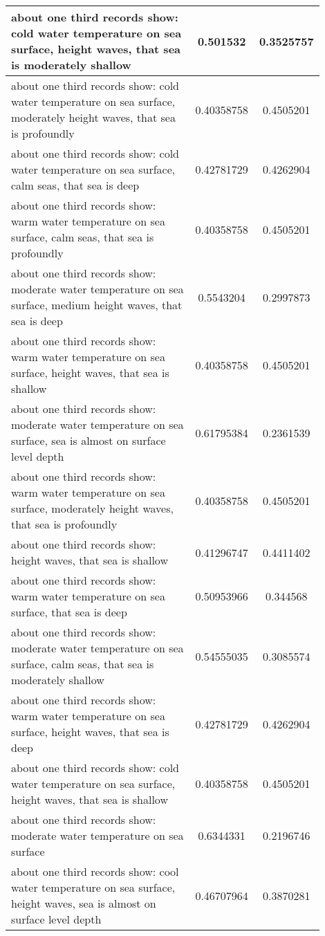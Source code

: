 \documentclass{article}
\begin{document}
\begin{longtable}{|p{0.9\linewidth}|c|c|}
about one third records show: cold water temperature on sea surface, height waves, that sea is moderately shallow & 0.501532 & 0.3525757 \\ \hline
about one third records show: cold water temperature on sea surface, moderately height waves, that sea is profoundly & 0.40358758 & 0.4505201 \\ \hline
about one third records show: cold water temperature on sea surface, calm seas, that sea is deep & 0.42781729 & 0.4262904 \\ \hline
about one third records show: warm water temperature on sea surface, calm seas, that sea is profoundly & 0.40358758 & 0.4505201 \\ \hline
about one third records show: moderate water temperature on sea surface, medium height waves, that sea is deep & 0.5543204 & 0.2997873 \\ \hline
about one third records show: warm water temperature on sea surface, height waves, that sea is shallow & 0.40358758 & 0.4505201 \\ \hline
about one third records show: moderate water temperature on sea surface, sea is almost on surface level depth & 0.61795384 & 0.2361539 \\ \hline
about one third records show: warm water temperature on sea surface, moderately height waves, that sea is profoundly & 0.40358758 & 0.4505201 \\ \hline
about one third records show: height waves, that sea is shallow & 0.41296747 & 0.4411402 \\ \hline
about one third records show: warm water temperature on sea surface, that sea is deep & 0.50953966 & 0.344568 \\ \hline
about one third records show: moderate water temperature on sea surface, calm seas, that sea is moderately shallow & 0.54555035 & 0.3085574 \\ \hline
about one third records show: warm water temperature on sea surface, height waves, that sea is deep & 0.42781729 & 0.4262904 \\ \hline
about one third records show: cold water temperature on sea surface, height waves, that sea is shallow & 0.40358758 & 0.4505201 \\ \hline
about one third records show: moderate water temperature on sea surface & 0.6344331 & 0.2196746 \\ \hline
about one third records show: cool water temperature on sea surface, height waves, sea is almost on surface level depth & 0.46707964 & 0.3870281 \\ \hline

\end{longtable}
\end{document}
